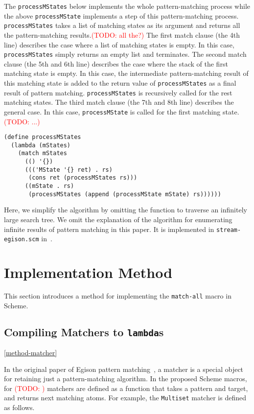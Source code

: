 \documentclass[acmlarge]{acmart}
\newcommand{\todo}[1]{\textcolor{red}{(TODO: #1)}}
\begin{document}
The \texttt{processMStates} below implements the whole pattern-matching process while the above \texttt{processMState} implements a step of this pattern-matching process.
\texttt{processMStates} takes a list of matching states as its argument and returns all the pattern-matching results.\todo{all the?}
The first match clause (the 4th line) describes the case where a list of matching states is empty.
In this case, \texttt{processMStates} simply returns an empty list and terminates.
The second match clause (the 5th and 6th line) describes the case where the stack of the first matching state is empty.
In this case, the intermediate pattern-matching result of this matching state is added to the return value of \texttt{processMStates} as a final result of pattern matching.
\texttt{processMStates} is recursively called for the rest matching states.
The third match clause (the 7th and 8th line) describes the general case.
In this case, \texttt{processMState} is called for the first matching state.
\todo{...}

\begin{lstlisting}[language=egison]
(define processMStates
  (lambda (mStates)
    (match mStates
      (() '{})
      ((('MState '{} ret) . rs)
       (cons ret (processMStates rs)))
      ((mState . rs)
       (processMStates (append (processMState mState) rs))))))
\end{lstlisting}

Here, we simplify the algorithm by omitting the function to traverse an infinitely large search tree.
We omit the explanation of the algorithm for enumerating infinite results of pattern matching in this paper.
It is implemented in \texttt{stream-egison.scm} in~\cite{egisonScheme}.

\section{Implementation Method}\label{method}

This section introduces a method for implementing the \texttt{match-all} macro in Scheme.

\subsection{Compiling Matchers to \texttt{lambda}s}\ref{method-matcher}

In the original paper of Egison pattern matching~\cite{egi2018aplas}, a matcher is a special object for retaining just a pattern-matching algorithm.
In the proposed Scheme macros, for \todo{} matchers are defined as a function that takes a pattern and target, and returns next matching atoms.
For example, the \texttt{Multiset} matcher is defined as follows.
\end{document}
